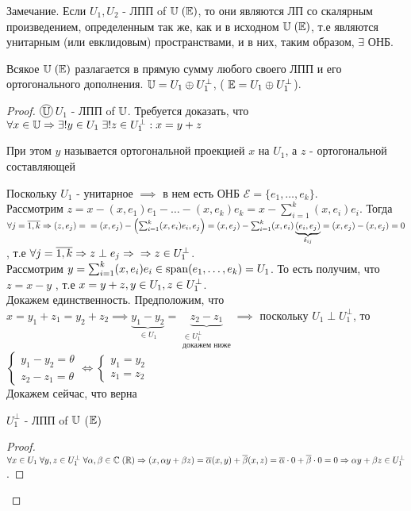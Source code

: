\documentclass[../main.tex]{subfiles}
\begin{document}
Замечание. Если $U_{1}, U_{2}$ - ЛПП of $\U \; (\E)$, то они являются ЛП со скалярным произведением, определенным так же, как и в исходном $\U \; (\E)$, т.е являются унитарным (или евклидовым) пространствами, и в них, таким образом, $\exists$ ОНБ. 
\begin{theorem}
    Всякое $\U\;(\E)$ разлагается в прямую сумму любого своего ЛПП и его ортогонального дополнения. $\U = U_{1} \oplus U_{1}^{\perp}$, ( $\E = U_{1} \oplus U_{1}^{\perp}$). 
\end{theorem}
\begin{proof}
    $\tcircle{$\U$}$\; $U_{1}$ - ЛПП of $\U$. Требуется доказать, что $\forall x \in \U \implies \exists ! y \in U_{1}\; \exists ! z \in U_{1}^{\perp} : x= y+z$\\ 
    \begin{definition}
        При этом $y$ называется ортогональной проекцией $x$ на $U_{1}$, а $z$ - ортогональной составляющей
    \end{definition}
    Поскольку $U_{1} $ - унитарное $\implies$ в нем есть ОНБ $\mathcal{E} = \{e_{1},\dots,e_{k}\}$.
    \\ Рассмотрим $z = x - (x,e_{1})e_{1} - \dots - (x,e_{k})e_{k} = x - \sum_{i   =1}^{k}     (x,e_{i})e_{i}$. Тогда $\forall j = \overline{1,k}\implies (z,e_{j}) = \\=(x,e_{j}) - \left(\sum_{i    =1}^{k}     (x,e_{i})e_{i},e_{j}\right) = (x,e_{j}) - \sum_{i=1}^{k} (x,e_{i})\underbrace{(e_{i},e_{j})}_{\delta_{ij}} = (x,e_{j}) - (x,e_{j}) = 0 $, т.е $\forall j =\overline{1,k}\implies z \perp e_{j} \implies \\\implies z \in U_{1}^{\perp}$.\\ 
    Рассмотрим $y = \sum_{i =1}^{k} ( x,e_{i})e_{i} \in \spann (e_{1},\dots,e_{k}) = U_{1}$. То есть получим, что $z = x-y $ , т.е $x=y+z, \\y\in U_{1}, z \in U_{1}^{\perp}$. 
    \\Докажем единственность. Предположим, что $x= y_{1}+z_{1} = y_{2}+z_{2} \implies \underbrace{y_{1}-y_{2}}_{\in U_{1}} =\underbrace{ z_{2}-z_{1}}_{\substack{\in U_{1}^{\perp} \\ \text{докажем ниже}}}\implies $ поскольку $U_{1}\perp U_{1}^{\perp}$, то $\begin{cases}
        y_{1}-y_{2} = \theta \\ 
        z_{2}-z_{1} = \theta
    \end{cases}\Leftrightarrow \begin{cases}
        y_{1} = y_{2} \\ 
        z_{1} = z_{2}
    \end{cases}$
    \\ Докажем сейчас, что верна
    \begin{theorem}
        $U_{1}^{\perp}$ - ЛПП of $\U$ ($\E$)
    \end{theorem}
\begin{proof}
    $\forall x \in U_{1} \; \forall y,z \in U_{1}^{\perp} \; \forall \alpha,\beta \in \C\;(\R) \implies (x,\alpha y + \beta z) = \overline{\alpha} ( x,y) + \overline{\beta} (x,z) = \overline{\alpha} \cdot 0 + \overline{\beta} \cdot 0 = 0 \implies \alpha y + \beta z \in U_{1}^{\perp}$.
\end{proof}


\end{proof}
\end{document}

